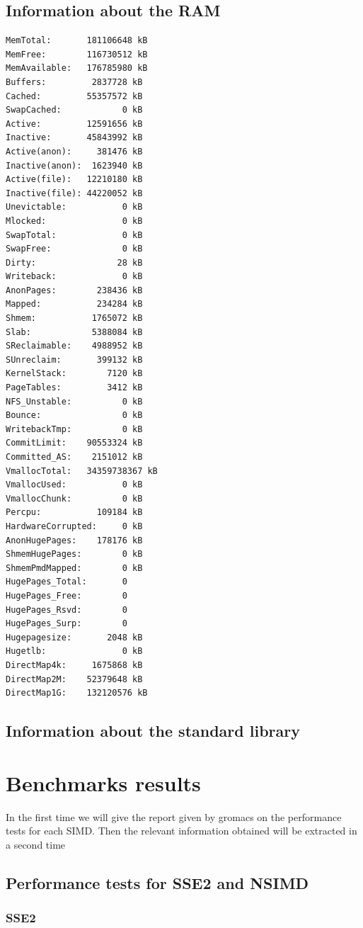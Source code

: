 	\subsection{Information about the RAM}
	\begin{lstlisting}[frame=single]
MemTotal:       181106648 kB
MemFree:        116730512 kB
MemAvailable:   176785980 kB
Buffers:         2837728 kB
Cached:         55357572 kB
SwapCached:            0 kB
Active:         12591656 kB
Inactive:       45843992 kB
Active(anon):     381476 kB
Inactive(anon):  1623940 kB
Active(file):   12210180 kB
Inactive(file): 44220052 kB
Unevictable:           0 kB
Mlocked:               0 kB
SwapTotal:             0 kB
SwapFree:              0 kB
Dirty:                28 kB
Writeback:             0 kB
AnonPages:        238436 kB
Mapped:           234284 kB
Shmem:           1765072 kB
Slab:            5388084 kB
SReclaimable:    4988952 kB
SUnreclaim:       399132 kB
KernelStack:        7120 kB
PageTables:         3412 kB
NFS_Unstable:          0 kB
Bounce:                0 kB
WritebackTmp:          0 kB
CommitLimit:    90553324 kB
Committed_AS:    2151012 kB
VmallocTotal:   34359738367 kB
VmallocUsed:           0 kB
VmallocChunk:          0 kB
Percpu:           109184 kB
HardwareCorrupted:     0 kB
AnonHugePages:    178176 kB
ShmemHugePages:        0 kB
ShmemPmdMapped:        0 kB
HugePages_Total:       0
HugePages_Free:        0
HugePages_Rsvd:        0
HugePages_Surp:        0
Hugepagesize:       2048 kB
Hugetlb:               0 kB
DirectMap4k:     1675868 kB
DirectMap2M:    52379648 kB
DirectMap1G:    132120576 kB
	\end{lstlisting}
	
	\subsection{Information about the standard library}
\section{Benchmarks results} %

In the first time we will give the report given by gromacs on the performance tests for each SIMD. Then the relevant information obtained will be extracted in a second time
 
\subsection{Performance tests for SSE2 and NSIMD}
\subsubsection{SSE2}
